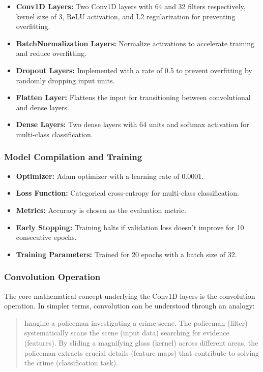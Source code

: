 \begin{itemize}
    \item \textbf{Conv1D Layers:} Two Conv1D layers with 64 and 32 filters respectively, kernel size of 3, ReLU activation, and L2 regularization for preventing overfitting.
    \item \textbf{BatchNormalization Layers:} Normalize activations to accelerate training and reduce overfitting.
    \item \textbf{Dropout Layers:} Implemented with a rate of 0.5 to prevent overfitting by randomly dropping input units.
    \item \textbf{Flatten Layer:} Flattens the input for transitioning between convolutional and dense layers.
    \item \textbf{Dense Layers:} Two dense layers with 64 units and softmax activation for multi-class classification.
\end{itemize}

\subsubsection{Model Compilation and Training}

\begin{itemize}
    \item \textbf{Optimizer:} Adam optimizer with a learning rate of 0.0001.
    \item \textbf{Loss Function:} Categorical cross-entropy for multi-class classification.
    \item \textbf{Metrics:} Accuracy is chosen as the evaluation metric.
    \item \textbf{Early Stopping:} Training halts if validation loss doesn't improve for 10 consecutive epochs.
    \item \textbf{Training Parameters:} Trained for 20 epochs with a batch size of 32.
\end{itemize}


\subsubsection{Convolution Operation}

The core mathematical concept underlying the Conv1D layers is the convolution operation. In simpler terms, convolution can be understood through an analogy:

\begin{quote}
 Imagine a policeman investigating a crime scene. The policeman (filter) systematically scans the scene (input data) searching for evidence (features). By sliding a magnifying glass (kernel) across different areas, the policeman extracts crucial details (feature maps) that contribute to solving the crime (classification task).
\end{quote}


